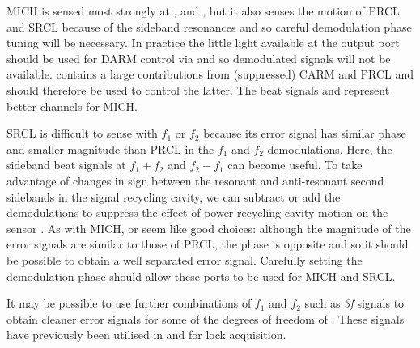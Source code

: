 \gls{MICH} is sensed most strongly at \ASSECOND{}, \POPFIRST{} and \REFLSUM{}, but it also senses the motion of \gls{PRCL} and \gls{SRCL} because of the sideband resonances and so careful demodulation phase tuning will be necessary. In practice the little light available at the output port should be used for \gls{DARM} control via \ASDC{} and so demodulated signals will not be available. \POPFIRST{} contains a large contributions from (suppressed) \gls{CARM} and \gls{PRCL} and should therefore be used to control the latter. The beat signals \REFLSUM{} and \REFLDIFF{} represent better channels for \gls{MICH}.

\gls{SRCL} is difficult to sense with $f_1$ or $f_2$ because its error signal has similar phase and smaller magnitude than \gls{PRCL} in the $f_1$ and $f_2$ demodulations. Here, the sideband beat signals at $f_1 + f_2$ and $f_2 - f_1$ can become useful. To take advantage of changes in sign between the resonant and anti-resonant second sidebands in the signal recycling cavity, we can subtract or add the demodulations to suppress the effect of power recycling cavity motion on the sensor \cite{Effler2014}. As with \gls{MICH}, \REFLSUM{} or \REFLDIFF{} seem like good choices: although the magnitude of the error signals are similar to those of \gls{PRCL}, the phase is opposite and so it should be possible to obtain a well separated error signal. Carefully setting the demodulation phase should allow these ports to be used for \gls{MICH} and \gls{SRCL}.

It may be possible to use further combinations of $f_1$ and $f_2$ such as \emph{3f} signals to obtain cleaner error signals for some of the degrees of freedom of \ETLF{}. These signals have previously been utilised in \VIRGO{} \cite{Acernese2008} and \ALIGO{} \cite{Staley2014} for lock acquisition.


